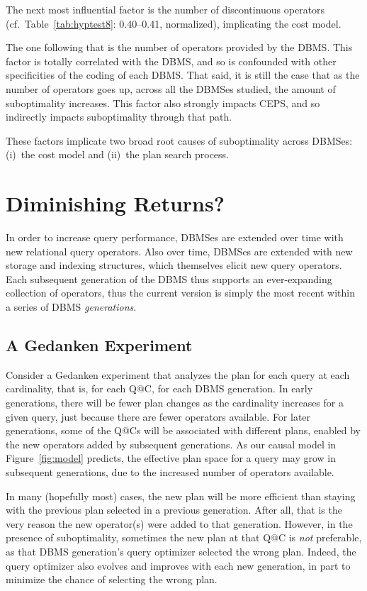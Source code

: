 \documentclass[prodmode,acmtods]{acmsmall}
\begin{document}
The next most influential factor is the number of discontinuous operators
(cf.~Table~\ref{tab:hyptest8}: 0.40--0.41, normalized),
\hbox{implicating} the cost model.

The one following that is the number of operators provided by the \hbox{DBMS}.
This factor is totally correlated with the \hbox{DBMS}, and so
is confounded with other specificities of the coding of each \hbox{DBMS}. That said,
it is still the case that as the number of operators goes up, across
all the \hbox{DBMSes} studied, the amount of suboptimality increases. This
\hbox{factor} also strongly impacts CEPS, and so indirectly impacts suboptimality
through that path.

These factors implicate two broad root causes of suboptimality across \hbox{DBMSes}:
(i)~the cost model and (ii)~the plan search process.

\section{Diminishing Returns?}
In order to increase query performance, \hbox{DBMSes} are extended over time with
new \hbox{relational} query operators. Also over time, \hbox{DBMSes} are extended with new
storage and indexing structures,
which themselves elicit new query operators. Each subsequent generation of
the \hbox{DBMS} thus supports an ever-expanding collection of operators,
thus the current version is simply the most recent within a series of \hbox{DBMS}
{\em generations}.

\subsection{A Gedanken Experiment}\label{sec:gedanken}
Consider a Gedanken experiment that analyzes the plan for each query at
each cardinality, that is, for each Q@C, for each \hbox{DBMS} generation. In early
generations, there will be fewer plan changes as the cardinality increases
for a given query, just \hbox{because} there are fewer operators available. For
later generations, some of the Q@Cs will be associated with different plans,
enabled by the new operators added by subsequent generations. As our causal
model in Figure~\ref{fig:model} predicts, the effective plan space for a
query may grow in subsequent generations, due to the increased number of
operators available.

In many (hopefully most) cases, the new plan will be more efficient than
staying with the previous plan selected in a previous generation. After all,
that is the very reason the new operator(s) were added to that generation.
However, in the presence of suboptimality,
sometimes the new plan at that Q@C is {\em not} preferable,
as that \hbox{DBMS} generation's query optimizer selected the wrong
plan.  Indeed, the query optimizer also evolves and improves with each new
generation, in part to minimize the chance of selecting the wrong plan.
\end{document}
